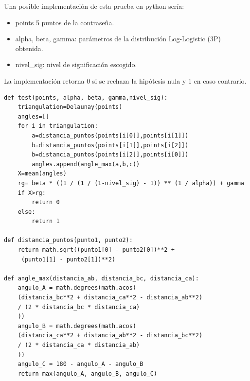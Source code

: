 \documentclass[12pt]{report}
\begin{document}
Una posible implementación de esta prueba en python sería:




\begin{itemize}
	\item points 5 puntos de la contraseña.
	\item alpha, beta, gamma: parámetros de la distribución Log-Logistic (3P) obtenida.
	\item nivel\_sig: nivel de significación escogido.
	
\end{itemize}
La implementación retorna 0 si se rechaza la hipótesis nula y 1 en caso contrario. 





\begin{lstlisting}
def test(points, alpha, beta, gamma,nivel_sig):
	triangulation=Delaunay(points)
	angles=[]
	for i in triangulation:
		a=distancia_puntos(points[i[0]],points[i[1]])
		b=distancia_puntos(points[i[1]],points[i[2]])
		b=distancia_puntos(points[i[2]],points[i[0]])
		angles.append(angle_max(a,b,c))     
	X=mean(angles) 
	rg= beta * ((1 / (1 / (1-nivel_sig) - 1)) ** (1 / alpha)) + gamma
	if X>rg:
		return 0
	else:
		return 1

def distancia_puntos(punto1, punto2):
	return math.sqrt((punto1[0] - punto2[0])**2 +
	 (punto1[1] - punto2[1])**2)

def angle_max(distancia_ab, distancia_bc, distancia_ca):
	angulo_A = math.degrees(math.acos(
	(distancia_bc**2 + distancia_ca**2 - distancia_ab**2) 
	/ (2 * distancia_bc * distancia_ca)
	))
	angulo_B = math.degrees(math.acos(
	(distancia_ca**2 + distancia_ab**2 - distancia_bc**2) 
	/ (2 * distancia_ca * distancia_ab)
	))
	angulo_C = 180 - angulo_A - angulo_B  
	return max(angulo_A, angulo_B, angulo_C)
\end{lstlisting}
\end{document}
